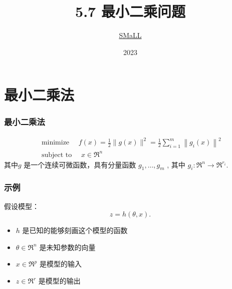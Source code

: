 \documentclass[11pt]{beamer}
\begin{document}






\title[数值优化]{5.7 最小二乘问题}

\bigskip

\author[]{
		 \underline{SMaLL} 
	}
	
		
\date[2023]{\small    2023}


\subject{5.7 最小二乘问题}
\frame{\titlepage}
	

		

\section{最小二乘法}

\begin{frame}
\frametitle{最小二乘法}


$$
\begin{array}{l}
	\text { minimize } \quad f(x)=\frac{1}{2}\|g(x)\|^{2}=\frac{1}{2} \sum_{i=1}^{m}\left\|g_{i}(x)\right\|^{2}\\
	\text { subject to } \quad x \in \Re^{n}
\end{array}
$$
	其中$g$ 是一个连续可微函数，具有分量函数 $g_{1}, \ldots, g_{m}$ , 其中 $g_{i}: \Re^{n} \rightarrow \Re^{r_{i}} .$
\end{frame}

\begin{frame}
\frametitle{示例}


假设模型：
$$
z=h(\theta, x).
$$



\begin{itemize}
	\item $h$ 是已知的能够刻画这个模型的函数
	\item $\theta \in \Re^{n}$ 是未知参数的向量
\item $x \in \Re^{p}$ 是模型的输入
	\item $z \in \Re^{r}$ 是模型的输出
	
\end{itemize}
\end{frame}
\end{document}
